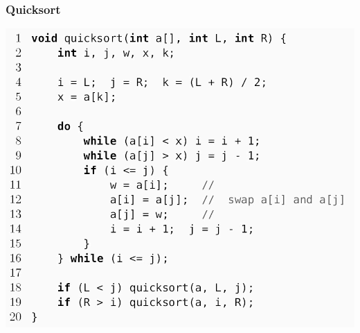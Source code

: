 \documentclass{beamer}
\begin{document}
\begin{frame} \frametitle{Quicksort}
	\centering
	\includegraphics[height=.95\textheight]{./tut09_quicksort.jpg}
\end{frame}
\end{document}
